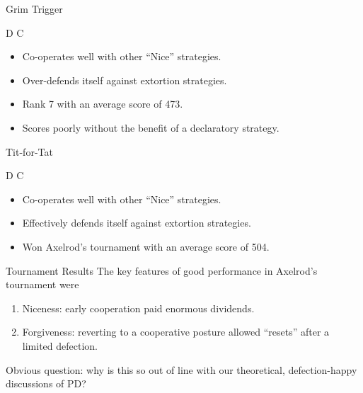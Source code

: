 \documentclass[pdf]{beamer}
\begin{document}
\begin{frame}{Grim Trigger}
  \begin{center}
    \begin{algorithmic}
        \State \Return D
      \EndIf
      \State \Return C
      \EndProcedure  
    \end{algorithmic}
  \end{center}

  \begin{itemize}
  \item Co-operates well with other ``Nice'' strategies.
    \pause\item Over-defends itself against extortion strategies.
    \pause\item Rank 7 with an average score of 473.
    \pause\item Scores poorly without the benefit of a declaratory strategy.
  \end{itemize}
\end{frame}

\begin{frame}{Tit-for-Tat}
  \begin{center}
    \begin{algorithmic}
        \State \Return D
      \EndIf
      \State \Return C
      \EndProcedure  
    \end{algorithmic}
  \end{center}

  \begin{itemize}
  \item Co-operates well with other ``Nice'' strategies.
  \pause\item Effectively defends itself against extortion strategies.
  \pause\item Won Axelrod's tournament with an average score of 504.
  \end{itemize}
\end{frame}

\begin{frame}{Tournament Results}
  The key features of good performance in Axelrod's tournament were

  \begin{enumerate}
  \item Niceness: early cooperation paid enormous dividends.
  \item Forgiveness: reverting to a cooperative posture allowed ``resets'' after a limited defection.
  \end{enumerate}

  Obvious question: why is this so out of line with our theoretical,
  defection-happy discussions of PD?
\end{frame}
\end{document}
